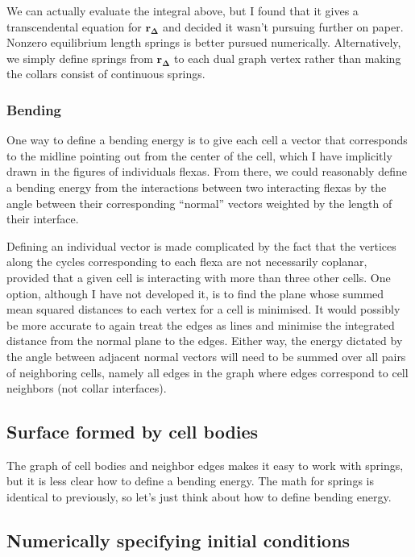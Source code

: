 We can actually evaluate the integral above, but I found that it gives a transcendental equation for $\bm{r_\Delta}$ and decided it wasn't pursuing further on paper. 
Nonzero equilibrium length springs is better pursued numerically. 
Alternatively, we simply define springs from $\bm{r_\Delta}$ to each dual graph vertex rather than making the collars consist of continuous springs.

\subsubsection{Bending}

One way to define a bending energy is to give each cell a vector that corresponds to the midline pointing out from the center of the cell, which I have implicitly drawn in the figures of individuals flexas. 
From there, we could reasonably define a bending energy from the interactions between two interacting flexas by the angle between their corresponding ``normal'' vectors weighted by the length of their interface. 

Defining an individual vector is made complicated by the fact that the vertices along the cycles corresponding to each flexa are not necessarily coplanar, provided that a given cell is interacting with more than three other cells. 
One option, although I have not developed it, is to find the plane whose summed mean squared distances to each vertex for a cell is minimised. 
It would possibly be more accurate to again treat the edges as lines and minimise the integrated distance from the normal plane to the edges. 
Either way, the energy dictated by the angle between adjacent normal vectors will need to be summed over all pairs of neighboring cells, namely all edges in the graph where edges correspond to cell neighbors (not collar interfaces).

\subsection{Surface formed by cell bodies}

The graph of cell bodies and neighbor edges makes it easy to work with springs, but it is less clear how to define a bending energy. 
The math for springs is identical to previously, so let's just think about how to define bending energy.


\subsection{Numerically specifying initial conditions} \label{subsec:init}

